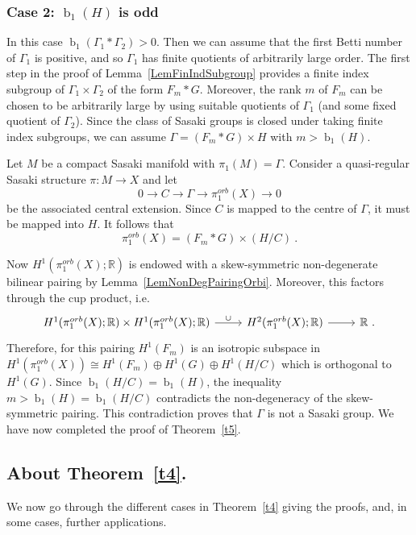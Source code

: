 \documentclass[12pt,leqno]{amsart}
\newcommand{\lra}{\longrightarrow}
\newcommand{\R}{\mathbb{R}}
\newcommand{\betti}{{\operatorname{b}}}
\begin{document}
\subsubsection*{Case 2: $\betti_1(H)$ is odd}
In this case $\betti_1(\Gamma_1* \Gamma_2)>0$. 
Then we can assume that the first Betti number of $\Gamma_1$ is positive, and so $\Gamma_1$ has finite
quotients of arbitrarily large order.
The first step in the proof of Lemma~\ref{LemFinIndSubgroup} provides a finite index subgroup of $\Gamma_1\times\Gamma_2$ 
of the form $F_m* G$. Moreover, the rank $m$ of $F_m$ can be chosen to be arbitrarily large by using suitable
quotients of $\Gamma_1$ (and some fixed quotient of $\Gamma_2$).
Since the class of Sasaki groups is closed under taking finite index subgroups, we can assume 
$\Gamma=(F_m* G)\times H$ with $m>\betti_1(H)$. 

Let $M$ be a compact Sasaki manifold with $\pi_1(M)=\Gamma$. Consider a quasi-regular Sasaki structure 
$\pi\colon M\lra X $ and let
$$
0\longrightarrow C\longrightarrow\Gamma\longrightarrow\pi_1^{orb}(X )\longrightarrow 0 
$$
be the associated central extension.
Since $C$ is mapped to the centre of $\Gamma$, it must be mapped into $H$. It follows that 
$$
\pi_1^{orb}(X ) = (F_m* G)\times (H/C) \ .
$$

Now $H^1(\pi_1^{orb}(X );\R)$ is endowed with a skew-symmetric non-degenerate bilinear pairing by 
Lemma~\ref{LemNonDegPairingOrbi}. 
Moreover, this factors through the cup product, i.e. 
\begin{equation}\label{EqInducedProductOrbiFundGroup}
	\begin{tikzcd}[row sep=tiny]
		H^1(\pi_1^{orb}(X );\R)\times H^1(\pi_1^{orb}(X );\R) \arrow[r, "\cup"]  &  H^2(\pi_1^{orb}(X );\R)  \arrow[r]  &\R\ .     
	\end{tikzcd} 
\end{equation}
Therefore, for this pairing $H^1(F_m)$ is an isotropic subspace in $H^1(\pi_1^{orb}(X ))\cong H^1(F_m)\oplus H^1(G)\oplus H^1(H/C)$ 
which is orthogonal to $H^1(G)$.
Since $\betti_1(H/C)=\betti_1(H)$, the inequality $m>\betti_1(H)=\betti_1(H/C)$ contradicts the non-degeneracy of the 
skew-symmetric pairing. This contradiction proves that $\Gamma$ is not a Sasaki group. We have now
completed the proof of Theorem~\ref{t5}.

\subsection{About Theorem~\ref{t4}.}
We now go through the different cases in  Theorem~\ref{t4} giving the proofs, and, in some cases, 
further applications.
\end{document}

